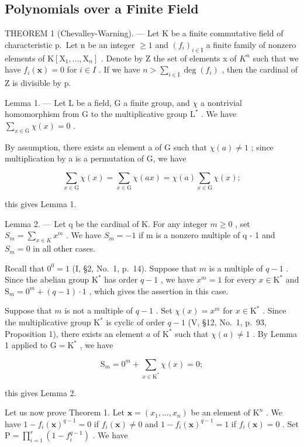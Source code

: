 \subsection{Polynomials over a Finite Field}

THEOREM 1 (Chevalley-Warning). --- Let K be a finite commutative field of characteristic p.~Let n be an integer \(\geqslant 1\) and \((f_{i})_{i\in\mathrm{I}}\) a finite family of nonzero elements of \(\mathrm{K}[\mathrm{X}_{1},\ldots,\mathrm{X}_{n}]\) . Denote by Z the set of elements x of \(K^{n}\) such that we have \(f_{i}(\mathbf{x})=0\) for \(i\in I\) . If we have \(n>\sum_{i\in\mathrm{I}}\deg(f_{i})\) , then the cardinal of Z is divisible by p.

Lemma 1. --- Let L be a field, G a finite group, and \(\chi\) a nontrivial homomorphism from G to the multiplicative group \(\mathrm{L}^*\) . We have \(\sum_{x\in \mathrm{G}}\chi (x) = 0\) .

By assumption, there exists an element a of G such that \(\chi(a) \neq 1\) ; since multiplication by a is a permutation of G, we have

\[
\sum_ {x \in \mathrm{G}} \chi (x) = \sum_ {x \in \mathrm{G}} \chi (a x) = \chi (a) \sum_ {x \in \mathrm{G}} \chi (x);
\]

this gives Lemma 1.

Lemma 2. --- Let q be the cardinal of K. For any integer \(m \geqslant 0\) , set \(S_{m} = \sum_{x \in K} x^{m}\) . We have \(S_{m} = -1\) if m is a nonzero multiple of q - 1 and \(S_{m} = 0\) in all other cases.

Recall that \(0^0 = 1\) (I, §2, No.~1, p.~14). Suppose that \(m\) is a multiple of \(q - 1\) . Since the abelian group \(\mathrm{K}^*\) has order \(q - 1\) , we have \(x^m = 1\) for every \(x \in \mathrm{K}^*\) and \(\mathrm{S}_m = 0^m + (q - 1) \cdot 1\) , which gives the assertion in this case.

Suppose that \(m\) is not a multiple of \(q - 1\) . Set \(\chi(x) = x^m\) for \(x \in \mathrm{K}^*\) . Since the multiplicative group \(\mathrm{K}^*\) is cyclic of order \(q - 1\) (V, §12, No.~1, p.~93, Proposition 1), there exists an element \(a\) of \(\mathrm{K}^*\) such that \(\chi(a) \neq 1\) . By Lemma 1 applied to \(\mathrm{G} = \mathrm{K}^*\) , we have

\[
\mathrm{S} _ {m} = 0 ^ {m} + \sum_ {x \in \mathrm{K} ^ {*}} \chi (x) = 0;
\]

this gives Lemma 2.

Let us now prove Theorem 1. Let \(\mathbf{x} = (x_1, \ldots, x_n)\) be an element of \(\mathrm{K}^n\) . We have \(1 - f_i(\mathbf{x})^{q-1} = 0\) if \(f_i(\mathbf{x}) \neq 0\) and \(1 - f_i(\mathbf{x})^{q-1} = 1\) if \(f_i(\mathbf{x}) = 0\) . Set \(\mathrm{P} = \prod_{i=1}^{r}(1 - f_i^{q-1})\) . We have


